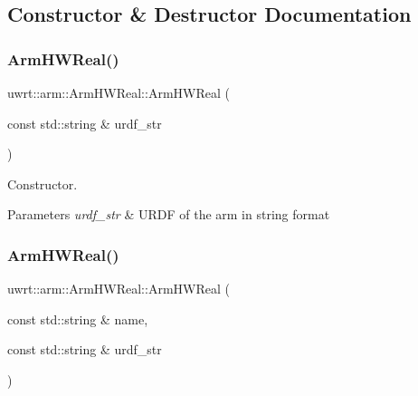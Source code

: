 \subsection{Constructor \& Destructor Documentation}
\mbox{\label{classuwrt_1_1arm_1_1_arm_h_w_real_ad7edcfcf86fd221726402cbbf0f7a6d3}} 
\subsubsection{\texorpdfstring{Arm\+H\+W\+Real()}{ArmHWReal()}\hspace{0.1cm}{\footnotesize\ttfamily [1/2]}}
{\footnotesize\ttfamily uwrt\+::arm\+::\+Arm\+H\+W\+Real\+::\+Arm\+H\+W\+Real (\begin{DoxyParamCaption}\item[{const std\+::string \&}]{urdf\+\_\+str }\end{DoxyParamCaption})\hspace{0.3cm}{\ttfamily [explicit]}}



Constructor. 


\begin{DoxyParams}{Parameters}
{\em urdf\+\_\+str} & U\+R\+DF of the arm in string format \\
\hline
\end{DoxyParams}
\mbox{\label{classuwrt_1_1arm_1_1_arm_h_w_real_aa79a19f491094474cb91e6a07eecf0ee}} 
\subsubsection{\texorpdfstring{Arm\+H\+W\+Real()}{ArmHWReal()}\hspace{0.1cm}{\footnotesize\ttfamily [2/2]}}
{\footnotesize\ttfamily uwrt\+::arm\+::\+Arm\+H\+W\+Real\+::\+Arm\+H\+W\+Real (\begin{DoxyParamCaption}\item[{const std\+::string \&}]{name,  }\item[{const std\+::string \&}]{urdf\+\_\+str }\end{DoxyParamCaption})}



